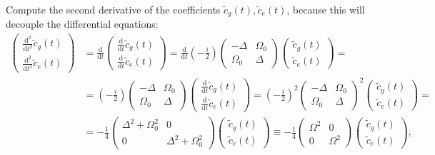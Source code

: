 \documentclass{article}
\newcommand{\diff}{\mathrm{d}}
\newcommand{\lr}[1]{\left(#1\right)}
\begin{document}
{	Compute the second derivative of the coefficients $\tilde{c}_g(t), \tilde{c}_e(t)$, because this will decouple the differential equations:
		\begin{align*}
			\begin{pmatrix}
				\frac{\diff^2}{\diff t^2} \tilde{c}_g(t)\\
				\frac{\diff^2}{\diff t^2} \tilde{c}_e(t)
			\end{pmatrix}
			&=
			\frac{\diff}{\diff t}
			\begin{pmatrix}
				\frac{\diff}{\diff t} \tilde{c}_g(t)\\
				\frac{\diff}{\diff t} \tilde{c}_e(t)
			\end{pmatrix}
			=
			\frac{\diff}{\diff t}
			\lr{ -\frac{i}{2} }
			\begin{pmatrix}
				-\Delta & \Omega_0 \\
				\Omega_0 & \Delta
			\end{pmatrix}
			\begin{pmatrix}
				\tilde{c}_g(t) \\
				\tilde{c}_e(t)
			\end{pmatrix}
			= \\
			&=
			\lr{ -\frac{i}{2} }
			\begin{pmatrix}
				-\Delta & \Omega_0 \\
				\Omega_0 & \Delta
			\end{pmatrix}
			\begin{pmatrix}
				\frac{\diff}{\diff t} \tilde{c}_g(t) \\
				\frac{\diff}{\diff t} \tilde{c}_e(t)
			\end{pmatrix}
			=
			\lr{ -\frac{i}{2} }^2
			\begin{pmatrix}
				-\Delta & \Omega_0 \\
				\Omega_0 & \Delta
			\end{pmatrix}^2
			\begin{pmatrix}
				\tilde{c}_g(t) \\
				\tilde{c}_e(t)
			\end{pmatrix}
			= \\
			&= -\frac{1}{4}
			\begin{pmatrix}
				\Delta^2 + \Omega_0^2 & 0 \\
				0 & \Delta^2 + \Omega_0^2
			\end{pmatrix}
			\begin{pmatrix}
				\tilde{c}_g(t) \\
				\tilde{c}_e(t)
			\end{pmatrix} \equiv
			-\frac{1}{4}
			\begin{pmatrix}
				\Omega^2 & 0 \\
				0 & \Omega^2
			\end{pmatrix}
			\begin{pmatrix}
				\tilde{c}_g(t) \\
				\tilde{c}_e(t)
			\end{pmatrix},
		\end{align*}
	
}
\end{document}
